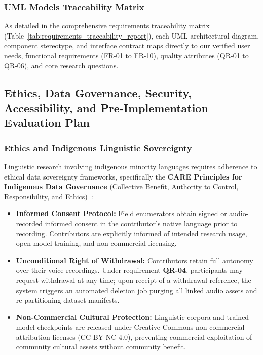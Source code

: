 \documentclass[a4paper,11pt]{article}
\begin{document}
\subsubsection{UML Models Traceability Matrix}
\label{sec:report_uml:matrix}
As detailed in the comprehensive requirements traceability matrix (Table~\ref{tab:requirements_traceability_report}), each UML architectural diagram, component stereotype, and interface contract maps directly to our verified user needs, functional requirements (FR-01 to FR-10), quality attributes (QR-01 to QR-06), and core research questions.
\subsection{Ethics, Data Governance, Security, Accessibility, and Pre-Implementation Evaluation Plan}
\label{sec:chap3_governance}

\subsubsection{Ethics and Indigenous Linguistic Sovereignty}
\label{sec:chap3_gov_ethics}
Linguistic research involving indigenous minority languages requires adherence to ethical data sovereignty frameworks, specifically the \textbf{CARE Principles for Indigenous Data Governance} (Collective Benefit, Authority to Control, Responsibility, and Ethics)~\cite{carroll2020care}:
\begin{itemize}
    \item \textbf{Informed Consent Protocol:} Field enumerators obtain signed or audio-recorded informed consent in the contributor's native language prior to recording. Contributors are explicitly informed of intended research usage, open model training, and non-commercial licensing.
    \item \textbf{Unconditional Right of Withdrawal:} Contributors retain full autonomy over their voice recordings. Under requirement \textbf{QR-04}, participants may request withdrawal at any time; upon receipt of a withdrawal reference, the system triggers an automated deletion job purging all linked audio assets and re-partitioning dataset manifests.
    \item \textbf{Non-Commercial Cultural Protection:} Linguistic corpora and trained model checkpoints are released under Creative Commons non-commercial attribution licenses (CC BY-NC 4.0), preventing commercial exploitation of community cultural assets without community benefit.
\end{itemize}
\end{document}
